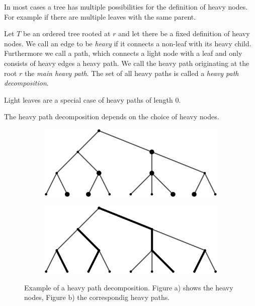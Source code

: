 \begin{rem}
In most cases a tree has multiple possibilities for the definition of heavy nodes. For example if there are multiple leaves with the same parent.
\end{rem}
\begin{defin}
Let $T$ be an ordered tree rooted at $r$ and let there be a fixed definition of heavy nodes. We call an edge to be \textit{heavy} if it connects a non-leaf with its heavy child. Furthermore we call a path, which connects a light node with a leaf and only consists of heavy edges a heavy path. We call the heavy path originating at the root $r$ the \textit{main heavy path}. The set of all heavy paths is called a \textit{heavy path decomposition}. 
\end{defin}
\begin{rem}
Light leaves are a special case of heavy paths of length 0.
\end{rem}
\begin{rem}
The heavy path decomposition depends on the choice of heavy nodes.
\end{rem}
\begin{figure}[!ht]
	\centering
	\begin{subfigure}[b]{0.45\textwidth}
	\caption{}
	\includegraphics[width=\textwidth]{figures/heavy_nodes.jpg}
    \end{subfigure}
    \begin{subfigure}[b]{0.45\textwidth}
	\caption{}
	\includegraphics[width=\textwidth]{figures/heavy_path_decomposition.jpg}
    \end{subfigure}
	\caption{Example of a heavy path decomposition. Figure a) shows the heavy nodes, Figure b) the correspondig heavy paths.}\label{fig:heavypath}
\end{figure}

